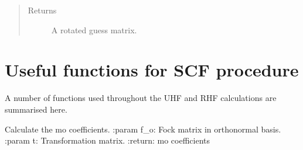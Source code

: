 \documentclass[letterpaper,10pt,english]{sphinxmanual}
\begin{document}
\begin{fulllineitems}
\begin{fulllineitems}
\begin{sphinxVerbatim}[commandchars=\\\{\}]
   
          
   
  
\end{sphinxVerbatim}
\begin{quote}\begin{description}
\item[{Returns}] \leavevmode
A rotated guess matrix.

\end{description}\end{quote}

\end{fulllineitems}


\end{fulllineitems}

\label{\detokenize{SCF_functions:module-hf.utilities.SCF_functions}}

\chapter{Useful functions for SCF procedure}
\label{\detokenize{SCF_functions:useful-functions-for-scf-procedure}}\label{\detokenize{SCF_functions::doc}}
A number of functions used throughout the UHF and RHF calculations are summarised here.

\begin{fulllineitems}
\label{\detokenize{SCF_functions:hf.utilities.SCF_functions.calc_mo}}
Calculate the mo coefficients.
:param f\_o: Fock matrix in orthonormal basis.
:param t: Transformation matrix.
:return: mo coefficients

\end{fulllineitems}
\end{document}
